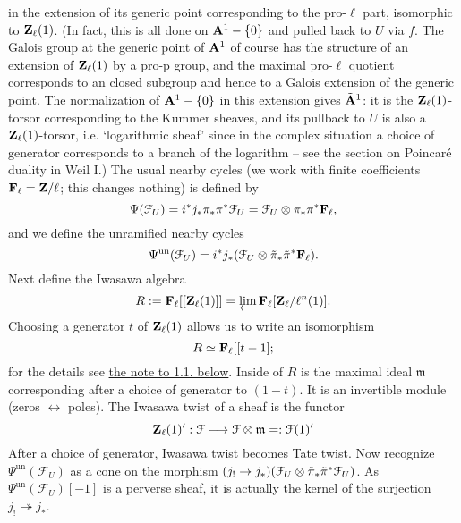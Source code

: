 \documentclass[deligne.tex]{subfiles}
\begin{document}
in the extension of its generic point corresponding to the pro-$\ell$ part,
isomorphic to $\mathbf{Z}_\ell(1)$.
(In fact, this is all done on $\mathbf{A}^1-\{0\}$ and pulled back to $U$ via $f$.
The Galois group at the generic point of $\mathbf{A}^1$ of course has the structure
of an extension of $\mathbf{Z}_\ell(1)$ by a pro-p group, and the maximal
pro-$\ell$ quotient corresponds to an closed subgroup and hence to a Galois
extension of the generic point. The normalization of $\mathbf{A}^1-\{0\}$ in this
extension gives $\tilde{\mathbf{A}}^1$: it is the $\mathbf{Z}_\ell(1)$-torsor
corresponding to the Kummer sheaves, and its pullback to $U$ is also a
$\mathbf{Z}_\ell(1)$-torsor, i.e. `logarithmic sheaf' since in the complex
situation a choice of generator corresponds to a branch of the logarithm
– see the section on Poincaré duality in Weil I.)
The usual nearby cycles
(we work with finite coefficients $\mathbf{F}_\ell=\mathbf{Z}/\ell$; this changes nothing)
is defined by
\begin{equation*}
	\Psi(\mathcal F_U)=i^*j_*\pi_*\pi^*\mathcal F_U
	=\mathcal F_U\otimes\pi_*\pi^*\mathbf{F}_\ell,
\end{equation*}
and we define the unramified nearby cycles
\begin{equation*}
	\Psi^{\mathrm{un}}(\mathcal F_U)
	=i^*j_*(\mathcal F_U\otimes\tilde\pi_*\tilde\pi^*\mathbf{F}_\ell).
\end{equation*}
Next define the Iwasawa algebra
\begin{equation*}
	R:=\mathbf{F}_\ell[[\mathbf{Z}_\ell(1)]]=\varprojlim\mathbf{F}_\ell[\mathbf{Z}_\ell/\ell^n(1)].
\end{equation*}
Choosing a generator $t$ of $\mathbf{Z}_\ell(1)$ allows us to write an isomorphism
\begin{equation*}
	R\simeq\mathbf{F}_\ell[[t-1];
\end{equation*}
for the details see \hyperref[glue:1.1]{the note to 1.1. below}.
Inside of $R$ is the maximal ideal $\mathfrak m$ corresponding
after a choice of generator to $(1-t)$.
It is an invertible module (zeros $\leftrightarrow$ poles).
The Iwasawa twist of a sheaf is the functor
\begin{equation*}
	\mathbf{Z}_\ell(1)':\mathcal F\longmapsto\mathcal F\otimes\mathfrak m
	=:\mathcal F(1)'
\end{equation*}
After a choice of generator, Iwasawa twist becomes Tate twist.
Now recognize $\Psi^{\mathrm{un}}(\mathcal F_U)$ as a cone on the morphism
$(j_!\rightarrow j_*)(\mathcal F_U\otimes\tilde\pi_*\tilde\pi^*\mathcal F_U)$.
As $\Psi^{\mathrm{un}}(\mathcal F_U)[-1]$ is a perverse sheaf, it is 
actually the kernel of the surjection $j_!\twoheadrightarrow j_*$.
\end{document}

